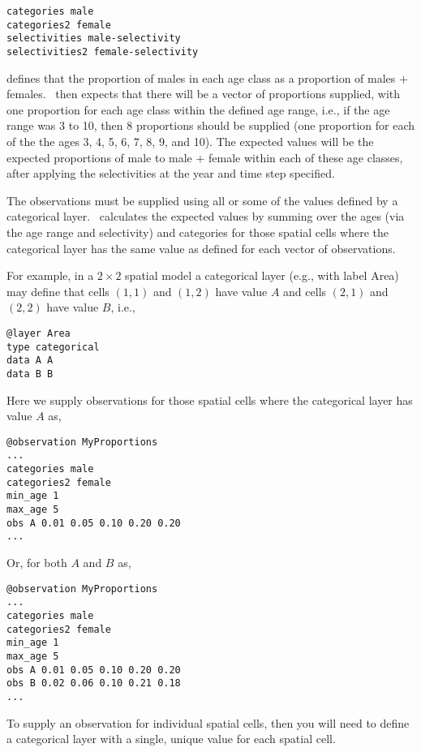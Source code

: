 \begin{verbatim}
categories male
categories2 female
selectivities male-selectivity
selectivities2 female-selectivity
\end{verbatim}

defines that the proportion of males in each age class as a proportion of males $+$ females. \SPM\ then expects that there will be a vector of proportions supplied, with one proportion for each age class within the defined age range, i.e., if the age range was 3 to 10, then 8 proportions should be supplied (one proportion for each of the the ages 3, 4, 5, 6, 7, 8, 9, and 10). The expected values will be the expected proportions of male to male $+$ female within each of these age classes, after applying the selectivities at the year and time step specified. 

The observations must be supplied using all or some of the values defined by a categorical layer. \SPM\ calculates the expected values by summing over the ages (via the age range and selectivity) and categories for those spatial cells where the categorical layer has the same value as defined for each vector of observations.

For example, in a $2 \times 2$ spatial model a categorical layer (e.g., with label Area) may define that cells $(1,1)$ and $(1,2)$ have value $A$ and cells $(2,1)$ and $(2,2)$ have value $B$, i.e.,

\begin{verbatim}
@layer Area
type categorical
data A A 
data B B
\end{verbatim}

Here we supply observations for those spatial cells where the categorical layer has value $A$ as, 

\begin{verbatim}
@observation MyProportions
...
categories male 
categories2 female
min_age 1
max_age 5
obs A 0.01 0.05 0.10 0.20 0.20
...
\end{verbatim}

Or, for both $A$ and $B$ as,

\begin{verbatim}
@observation MyProportions
...
categories male
categories2 female
min_age 1
max_age 5
obs A 0.01 0.05 0.10 0.20 0.20
obs B 0.02 0.06 0.10 0.21 0.18
...
\end{verbatim}

To supply an observation for individual spatial cells, then you will need to define a categorical layer with a single, unique value for each spatial cell. 

